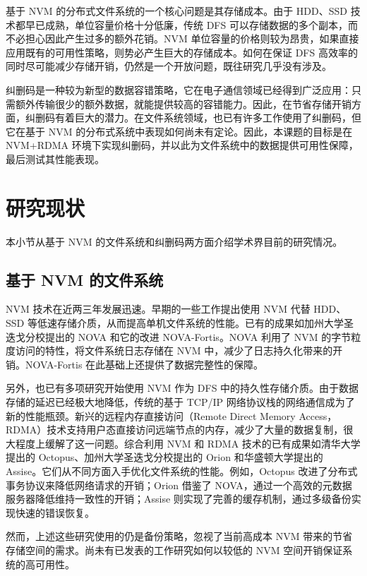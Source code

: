 基于 NVM 的分布式文件系统的一个核心问题是其存储成本。由于 HDD、SSD 技术都早已成熟，单位容量价格十分低廉，传统 DFS 可以存储数据的多个副本，而不必担心因此产生过多的额外花销。NVM 单位容量的价格则较为昂贵，如果直接应用既有的可用性策略，则势必产生巨大的存储成本。如何在保证 DFS 高效率的同时尽可能减少存储开销，仍然是一个开放问题，既往研究几乎没有涉及。

纠删码是一种较为新型的数据容错策略，它在电子通信领域已经得到广泛应用：只需额外传输很少的额外数据，就能提供较高的容错能力。因此，在节省存储开销方面，纠删码有着巨大的潜力。在文件系统领域，也已有许多工作使用了纠删码，但它在基于 NVM 的分布式系统中表现如何尚未有定论。因此，本课题的目标是在 NVM+RDMA 环境下实现纠删码，并以此为文件系统中的数据提供可用性保障，最后测试其性能表现。

\section{研究现状}
\label{sec:ch1_relworks}

本小节从基于 NVM 的文件系统和纠删码两方面介绍学术界目前的研究情况。

\subsection{基于 NVM 的文件系统}
\label{subsec:ch1_nvm_relworks}

NVM 技术在近两三年发展迅速。早期的一些工作提出使用 NVM 代替 HDD、SSD 等低速存储介质，从而提高单机文件系统的性能。已有的成果如加州大学圣迭戈分校提出的 NOVA\cite{nova2016} 和它的改进 NOVA-Fortis\cite{novafortis2017}。NOVA 利用了 NVM 的字节粒度访问的特性，将文件系统日志存储在 NVM 中，减少了日志持久化带来的开销。NOVA-Fortis 在此基础上还提供了数据完整性的保障。

另外，也已有多项研究开始使用 NVM 作为 DFS 中的持久性存储介质。由于数据存储的延迟已经极大地降低，传统的基于 TCP/IP 网络协议栈的网络通信成为了新的性能瓶颈。新兴的远程内存直接访问（Remote Direct Memory Access，RDMA）技术支持用户态直接访问远端节点的内存，减少了大量的数据复制，很大程度上缓解了这一问题。综合利用 NVM 和 RDMA 技术的已有成果如清华大学提出的 Octopus\cite{octopus2017}、加州大学圣迭戈分校提出的 Orion\cite{orion2019} 和华盛顿大学提出的 Assise\cite{assise2019}。它们从不同方面入手优化文件系统的性能。例如，Octopus 改进了分布式事务协议来降低网络请求的开销；Orion 借鉴了 NOVA，通过一个高效的元数据服务器降低维持一致性的开销；Assise 则实现了完善的缓存机制，通过多级备份实现快速的错误恢复。

然而，上述这些研究使用的仍是备份策略，忽视了当前高成本 NVM 带来的节省存储空间的需求。尚未有已发表的工作研究如何以较低的 NVM 空间开销保证系统的高可用性。

